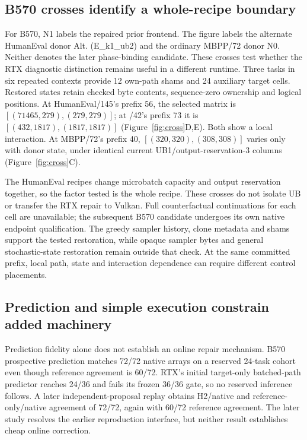\subsection{B570 crosses identify a whole-recipe boundary}
For B570, N1 labels the repaired prior frontend. The figure labels the alternate HumanEval donor Alt. (E\_k1\_ub2) and the ordinary MBPP/72 donor N0. Neither denotes the later phase-binding candidate. These crosses test whether the RTX diagnostic distinction remains useful in a different runtime. Three tasks in six repeated contexts provide 12 own-path shams and 24 auxiliary target cells. Restored states retain checked byte contents, sequence-zero ownership and logical positions. At HumanEval/145's prefix 56, the selected matrix is $[(71465,279),(279,279)]$; at /42's prefix 73 it is $[(432,1817),(1817,1817)]$ (Figure~\ref{fig:cross}D,E). Both show a local interaction. At MBPP/72's prefix 40, $[(320,320),(308,308)]$ varies only with donor state, under identical current UB1/output-reservation-3 columns (Figure~\ref{fig:cross}C).

The HumanEval recipes change microbatch capacity and output reservation together, so the factor tested is the whole recipe. These crosses do not isolate UB or transfer the RTX repair to Vulkan. Full counterfactual continuations for each cell are unavailable; the subsequent B570 candidate undergoes its own native endpoint qualification. The greedy sampler history, clone metadata and shams support the tested restoration, while opaque sampler bytes and general stochastic-state restoration remain outside that check. At the same committed prefix, local path, state and interaction dependence can require different control placements.

\subsection{Prediction and simple execution constrain added machinery}
Prediction fidelity alone does not establish an online repair mechanism. B570 prospective prediction matches 72/72 native arrays on a reserved 24-task cohort even though reference agreement is 60/72. RTX's initial target-only batched-path predictor reaches 24/36 and fails its frozen 36/36 gate, so no reserved inference follows. A later independent-proposal replay obtains H2/native and reference-only/native agreement of 72/72, again with 60/72 reference agreement. The later study resolves the earlier reproduction interface, but neither result establishes cheap online correction.


